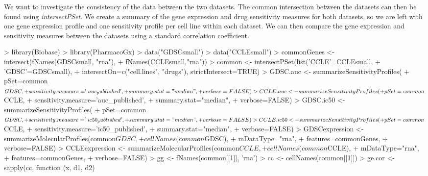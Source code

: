 \documentclass[11pt]{article}
\begin{document}
We want to investigate the consistency of the data between the two datasets. The common intersection between the datasets can then be found using \textit{intersectPSet}. We create a summary of the gene expression and drug sensitivity measures for both datasets, so we are left with one gene expression profile and one sensitivity profile per cell line within each dataset. We can then compare the gene expression and sensitivity measures between the datasets using a standard correlation coefficient. 

\begin{Schunk}
\begin{Sinput}
>   library(Biobase)
>   library(PharmacoGx)
>   data("GDSCsmall")
>   data("CCLEsmall")
>   commonGenes <- intersect(fNames(GDSCsmall, "rna"),
+                            fNames(CCLEsmall,"rna"))
>   common <- intersectPSet(list('CCLE'=CCLEsmall,
+                                'GDSC'=GDSCsmall),
+                           intersectOn=c("cell.lines", "drugs"), strictIntersect=TRUE)
>   GDSC.auc <- summarizeSensitivityProfiles(
+                 pSet=common$GDSC,
+                 sensitivity.measure='auc_published', 
+                 summary.stat="median",
+                 verbose=FALSE)
>   CCLE.auc <- summarizeSensitivityProfiles(
+                 pSet=common$CCLE,
+                 sensitivity.measure='auc_published', 
+                 summary.stat="median",
+                 verbose=FALSE)
>   GDSC.ic50 <- summarizeSensitivityProfiles(
+                 pSet=common$GDSC, 
+                 sensitivity.measure='ic50_published', 
+                 summary.stat="median",
+                 verbose=FALSE)
>   CCLE.ic50 <- summarizeSensitivityProfiles(
+                 pSet=common$CCLE, 
+                 sensitivity.measure='ic50_published', 
+                 summary.stat="median",
+                 verbose=FALSE)
>   GDSCexpression <- summarizeMolecularProfiles(common$GDSC, 
+                                         cellNames(common$GDSC),
+                                         mDataType="rna",
+                                         features=commonGenes,
+                                         verbose=FALSE)
>   CCLEexpression <- summarizeMolecularProfiles(common$CCLE, 
+                                          cellNames(common$CCLE),
+                                          mDataType="rna",
+                                          features=commonGenes,
+                                          verbose=FALSE)
>   gg <- fNames(common[[1]], 'rna')
>   cc <- cellNames(common[[1]])
>   ge.cor <- sapply(cc, function (x, d1, d2) {
}
\end{Sinput}
\end{Schunk}
\end{document}
